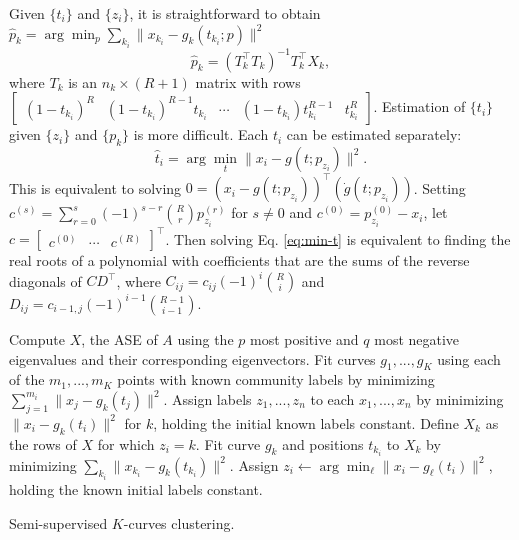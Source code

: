 \documentclass[12pt]{article}
\begin{document}
Given \(\{t_i\}\) and \(\{z_i\}\), it is straightforward to obtain
\(\hat{p}_k = \arg\min_p \sum_{k_i} \|x_{k_i} - g_k (t_{k_i}; p)\|^2\)
\[\hat{p}_k = (T_k^\top T_k)^{-1} T_k^\top X_k,\] where \(T_k\) is an
\(n_k \times (R+1)\) matrix with rows
\(\begin{bmatrix} (1 - t_{k_i})^R & (1 - t_{k_i})^{R-1} t_{k_i} & \cdots & (1 - t_{k_i}) t_{k_i}^{R-1} & t_{k_i}^R \end{bmatrix}\).
Estimation of \(\{t_i\}\) given \(\{z_i\}\) and \(\{p_k\}\) is more
difficult. Each \(t_i\) can be estimated separately:
\begin{equation} \label{eq:min-t}
\hat{t}_i = \arg\min_t \|x_i - g(t; p_{z_i})\|^2. 
\end{equation} This is equivalent to solving
\(0 = (x_i - g(t; p_{z_i}))^\top (\dot{g}(t; p_{z_i}))\). Setting
\(c^{(s)} = \sum_{r=0}^s (-1)^{s-r} \binom{R}{r} p^{(r)}_{z_i}\) for
\(s \neq 0\) and \(c^{(0)} = p^{(0)}_{z_i} - x_i\), let
\(c = \begin{bmatrix} c^{(0)} & \cdots & c^{(R)} \end{bmatrix}^\top\).
Then solving Eq. \ref{eq:min-t} is equivalent to finding the real roots
of a polynomial with coefficients that are the sums of the reverse
diagonals of \(C D^\top\), where \(C_{ij} = c_{ij} (-1)^i \binom{R}{i}\)
and \(D_{ij} = c_{i-1,j} (-1)^{i-1} \binom{R-1}{i-1}\).

\begin{algorithm}[h]
\DontPrintSemicolon
\SetAlgoLined
{}
Compute $X$, the ASE of $A$ using the $p$ most positive and $q$ most negative eigenvalues and their corresponding eigenvectors.\;
Fit curves $g_1, ..., g_K$ using each of the $m_1, ..., m_K$ points with known community labels by minimizing $\sum_{j=1}^{m_i} \|x_j - g_k(t_j)\|^2$.\;
Assign labels $z_1, ..., z_n$ to each $x_1, ..., x_n$ by minimizing $\|x_i - g_k(t_i)\|^2$ for $k$, holding the initial known labels constant.\; 
 {
 {
Define $X_k$ as the rows of $X$ for which $z_i = k$.\;
Fit curve $g_k$ and positions $t_{k_i}$ to $X_k$ by minimizing $\sum_{k_i} \|x_{k_i} - g_k(t_{k_i})\|^2$.\;
}
 {
Assign $z_i \leftarrow \arg\min_\ell \|x_i - g_\ell(t_i)\|^2$, holding the known initial labels constant.\
}
}
\caption{Semi-supervised $K$-curves clustering.}
\end{algorithm}
\end{document}
